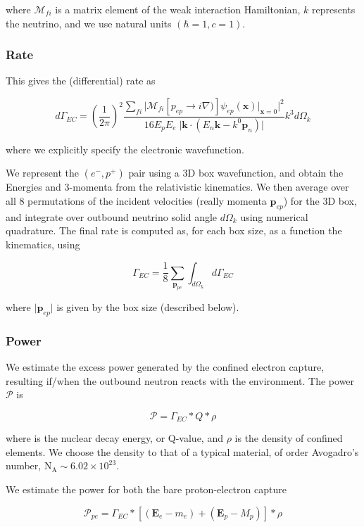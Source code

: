 \documentclass[%
 aip,
 jmp,%
 amsmath,amssymb,
 reprint,%
]{revtex4-1}
\begin{document}
where $\mathcal{M}_{fi}$ is a matrix element of the weak interaction Hamiltonian,  $k$ represents the neutrino, and we use natural units $(\hbar=1,c=1)$.


\subsubsection{Rate}

This gives the (differential) rate as

$$d\Gamma_{EC}=\left(\dfrac{1}{2\pi}\right)^{2}\dfrac{\sum_{fi}\big\vert\mathcal{M}_{fi}\left[p_{ep}\rightarrow i\nabla)\right]\psi_{ep}(\mathbf{x})\big\vert_{\mathbf{x}=0}\big\vert^{2}}{16E_{p}E_{e}\;\big\vert\mathbf{k}\cdot(E{_n}\mathbf{k}-k^{0}\mathbf{p}_{n})\big\vert}k^{3}d\Omega_{k}$$

where we explicitly specify the electronic wavefunction.

We represent the $(e^{-},p^{+})$ pair using a 3D box wavefunction, and obtain the Energies and 3-momenta from the relativistic kinematics.  We then average over all 8 permutations of the incident velocities (really momenta $\mathbf{p}_{ep}$) for the 3D box, and integrate over outbound neutrino solid angle $d\Omega_{k}$ using numerical quadrature.  The final rate is computed as, for each box size, as a function the kinematics, using

$$\Gamma_{EC}=\frac{1}{8}\sum_{\mathbf{p}_{pe}}\int_{d\Omega_{k}}d\Gamma_{EC}$$

where $\big\vert\mathbf{p}_{ep}\big\vert$ is given by the box size (described below).

\subsubsection{Power}

We  estimate the excess power generated by the confined electron capture, resulting if/when the outbound neutron reacts with the environment. 
The power $\mathcal{P}$ is

$$\mathcal{P}=\Gamma_{EC}*Q*\rho$$

where is the nuclear decay energy, or Q-value, and $\rho$ is the  density of confined elements.  We choose the density to that of a typical material, of order Avogadro's number, $\mathrm{N_{A}}\sim6.02\times10^{23}$.

We estimate the power for both the bare proton-electron capture

$$\mathcal{P}_{pe}=\Gamma_{EC}*\left[(\mathbf{E}_{e}-m_{e})+(\mathbf{E}_{p}-M_{p})\right]*\rho$$
\end{document}
